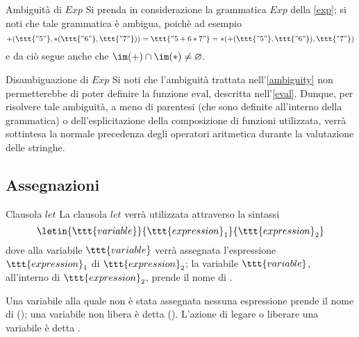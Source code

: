 \documentclass[a4paper, 12pt]{report}
\begin{document}
    \begin{framedobs}[label={ambiguity}]{Ambiguità di $Exp$}
        Si prenda in considerazione la grammatica $Exp$ della \cref{exp}; si noti che tale grammatica è ambigua, poichè ad esempio $$+(\ttt{"5"}, *(\ttt{"6"}, \ttt{"7"})) = \ttt{"5 + 6 * 7"} = *(+(\ttt{"5"}, \ttt{"6"}), \ttt{"7"})$$ e da ciò segue anche che $\im(+) \cap \im(*) \neq \varnothing$.
    \end{framedobs}

    \begin{framedobs}{Disambiguazione di $Exp$}
        Si noti che l'ambiguità trattata nell'\cref{ambiguity} non permetterebbe di poter definire la funzione $\mathrm{eval}$, descritta nell'\cref{eval}. Dunque, per risolvere tale ambiguità, a meno di parentesi (che  sono definite all'interno della grammatica) o dell'esplicitazione della composizione di funzioni utilizzata, verrà sottintesa la normale precedenza degli operatori aritmetica durante la valutazione delle stringhe.
    \end{framedobs}

    \subsection{Assegnazioni}

    \begin{frameddefn}[label={let}]{Clausola $let$}
        La clausola $let$ verrà utilizzata attraverso la sintassi $$\letin{\ttt{variable}}{\ttt{expression}_1}{\ttt{expression}_2}$$ dove alla variabile $\ttt{variable}$ verrà assegnata l'espressione $\ttt{expression}_1$  di $\ttt{expression}_2$; la variabile $\ttt{variable}$, all'interno di $\ttt{expression}_2$, prende il nome di .

        Una variabile alla quale non è stata assegnata nessuna espressione prende il nome di  (); una variabile non libera è detta  (). L'azione di legare o liberare una variabile è detta .
    \end{frameddefn}
    
\end{document}
